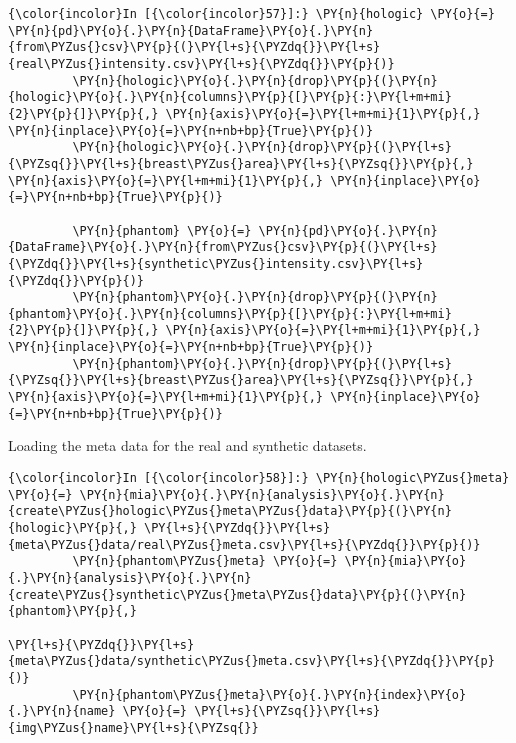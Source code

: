     \begin{Verbatim}[commandchars=\\\{\}]
{\color{incolor}In [{\color{incolor}57}]:} \PY{n}{hologic} \PY{o}{=} \PY{n}{pd}\PY{o}{.}\PY{n}{DataFrame}\PY{o}{.}\PY{n}{from\PYZus{}csv}\PY{p}{(}\PY{l+s}{\PYZdq{}}\PY{l+s}{real\PYZus{}intensity.csv}\PY{l+s}{\PYZdq{}}\PY{p}{)}
         \PY{n}{hologic}\PY{o}{.}\PY{n}{drop}\PY{p}{(}\PY{n}{hologic}\PY{o}{.}\PY{n}{columns}\PY{p}{[}\PY{p}{:}\PY{l+m+mi}{2}\PY{p}{]}\PY{p}{,} \PY{n}{axis}\PY{o}{=}\PY{l+m+mi}{1}\PY{p}{,} \PY{n}{inplace}\PY{o}{=}\PY{n+nb+bp}{True}\PY{p}{)}
         \PY{n}{hologic}\PY{o}{.}\PY{n}{drop}\PY{p}{(}\PY{l+s}{\PYZsq{}}\PY{l+s}{breast\PYZus{}area}\PY{l+s}{\PYZsq{}}\PY{p}{,} \PY{n}{axis}\PY{o}{=}\PY{l+m+mi}{1}\PY{p}{,} \PY{n}{inplace}\PY{o}{=}\PY{n+nb+bp}{True}\PY{p}{)}

         \PY{n}{phantom} \PY{o}{=} \PY{n}{pd}\PY{o}{.}\PY{n}{DataFrame}\PY{o}{.}\PY{n}{from\PYZus{}csv}\PY{p}{(}\PY{l+s}{\PYZdq{}}\PY{l+s}{synthetic\PYZus{}intensity.csv}\PY{l+s}{\PYZdq{}}\PY{p}{)}
         \PY{n}{phantom}\PY{o}{.}\PY{n}{drop}\PY{p}{(}\PY{n}{phantom}\PY{o}{.}\PY{n}{columns}\PY{p}{[}\PY{p}{:}\PY{l+m+mi}{2}\PY{p}{]}\PY{p}{,} \PY{n}{axis}\PY{o}{=}\PY{l+m+mi}{1}\PY{p}{,} \PY{n}{inplace}\PY{o}{=}\PY{n+nb+bp}{True}\PY{p}{)}
         \PY{n}{phantom}\PY{o}{.}\PY{n}{drop}\PY{p}{(}\PY{l+s}{\PYZsq{}}\PY{l+s}{breast\PYZus{}area}\PY{l+s}{\PYZsq{}}\PY{p}{,} \PY{n}{axis}\PY{o}{=}\PY{l+m+mi}{1}\PY{p}{,} \PY{n}{inplace}\PY{o}{=}\PY{n+nb+bp}{True}\PY{p}{)}
\end{Verbatim}

    Loading the meta data for the real and synthetic datasets.

    \begin{Verbatim}[commandchars=\\\{\}]
{\color{incolor}In [{\color{incolor}58}]:} \PY{n}{hologic\PYZus{}meta} \PY{o}{=} \PY{n}{mia}\PY{o}{.}\PY{n}{analysis}\PY{o}{.}\PY{n}{create\PYZus{}hologic\PYZus{}meta\PYZus{}data}\PY{p}{(}\PY{n}{hologic}\PY{p}{,} \PY{l+s}{\PYZdq{}}\PY{l+s}{meta\PYZus{}data/real\PYZus{}meta.csv}\PY{l+s}{\PYZdq{}}\PY{p}{)}
         \PY{n}{phantom\PYZus{}meta} \PY{o}{=} \PY{n}{mia}\PY{o}{.}\PY{n}{analysis}\PY{o}{.}\PY{n}{create\PYZus{}synthetic\PYZus{}meta\PYZus{}data}\PY{p}{(}\PY{n}{phantom}\PY{p}{,}
                                                                 \PY{l+s}{\PYZdq{}}\PY{l+s}{meta\PYZus{}data/synthetic\PYZus{}meta.csv}\PY{l+s}{\PYZdq{}}\PY{p}{)}
         \PY{n}{phantom\PYZus{}meta}\PY{o}{.}\PY{n}{index}\PY{o}{.}\PY{n}{name} \PY{o}{=} \PY{l+s}{\PYZsq{}}\PY{l+s}{img\PYZus{}name}\PY{l+s}{\PYZsq{}}
\end{Verbatim}

